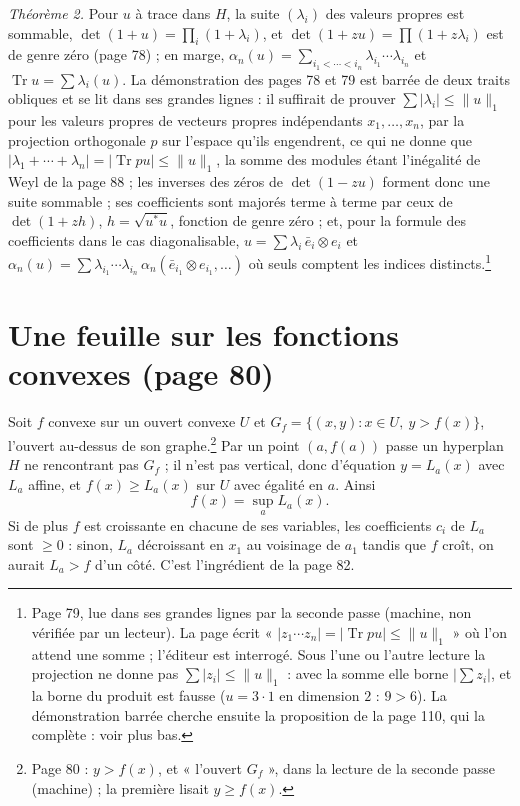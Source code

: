 \documentclass[11pt,a4paper]{article}
\begin{document}
\emph{Théorème 2.} Pour $u$ à trace dans $H$, la suite $(\lambda_i)$ des
valeurs propres est sommable, $\det(1+u) = \prod_i (1 + \lambda_i)$, et
$\det(1+zu) = \prod(1 + z\lambda_i)$ est de genre zéro (page 78) ;
en marge, $\alpha_n(u) = \sum_{i_1 < \cdots < i_n} \lambda_{i_1} \cdots
\lambda_{i_n}$ et $\operatorname{Tr} u = \sum \lambda_i(u)$. La démonstration
des pages 78 et 79 est barrée de deux traits obliques et se lit dans ses
grandes lignes : il suffirait de prouver $\sum |\lambda_i| \leq \|u\|_1$ pour
les valeurs propres de vecteurs propres indépendants $x_1, \ldots, x_n$, par
la projection orthogonale $p$ sur l'espace qu'ils engendrent, ce qui ne
donne que $|\lambda_1 + \cdots + \lambda_n| = |\operatorname{Tr} pu| \leq
\|u\|_1$, la somme des modules étant l'inégalité de Weyl de la page 88 ;
les inverses des zéros de $\det(1 - zu)$ forment donc une suite sommable ;
ses coefficients sont majorés terme à terme par ceux de $\det(1 + zh)$, $h =
\sqrt{u^{*}u}$, fonction de genre zéro ; et, pour la formule des coefficients dans le cas diagonalisable,
$u = \sum \lambda_i\,\bar{e}_i \otimes e_i$ et $\alpha_n(u) = \sum
\lambda_{i_1} \cdots \lambda_{i_n}\,\alpha_n(\bar{e}_{i_1} \otimes e_{i_1},
\ldots)$ où seuls comptent les indices distincts.\footnote{Page 79, lue dans
ses grandes lignes par la seconde passe (machine, non vérifiée par un
lecteur). La page écrit « $|z_1 \cdots z_n| = |\operatorname{Tr} pu| \leq
\|u\|_1$ » où l'on attend une somme ; l'éditeur est interrogé. Sous l'une ou
l'autre lecture la projection ne donne pas $\sum |z_i| \leq \|u\|_1$ : avec
la somme elle borne $|\sum z_i|$, et la borne du produit est fausse ($u =
3\cdot 1$ en dimension $2$ : $9 > 6$). La démonstration barrée cherche
ensuite la proposition de la page 110, qui la complète : voir plus
bas.}

\section*{Une feuille sur les fonctions convexes (page 80)}

Soit $f$ convexe sur un ouvert convexe $U$ et $G_f = \{(x,y) : x \in U,\ y
> f(x)\}$, l'ouvert au-dessus de son graphe.\footnote{Page 80 : $y > f(x)$,
et « l'ouvert $G_f$ », dans la lecture de la seconde passe (machine) ; la
première lisait $y \geq f(x)$.} Par un point $(a, f(a))$ passe un hyperplan
$H$ ne rencontrant pas $G_f$ ; il n'est pas vertical, donc
d'équation $y = L_a(x)$ avec $L_a$ affine, et $f(x) \geq L_a(x)$ sur $U$
avec égalité en $a$. Ainsi
\[
  f(x) = \sup_a L_a(x) .
\]
Si de plus $f$ est croissante en chacune de ses variables, les coefficients
$c_i$ de $L_a$ sont $\geq 0$ : sinon, $L_a$ décroissant en $x_1$ au voisinage
de $a_1$ tandis que $f$ croît, on aurait $L_a > f$ d'un côté. C'est
l'ingrédient de la page 82.
\end{document}

